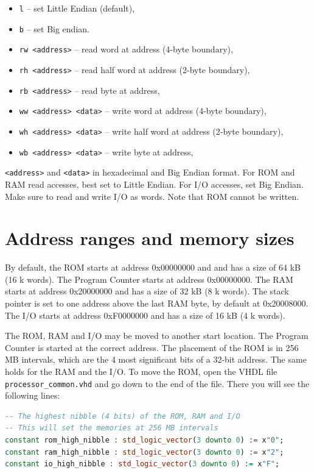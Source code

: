 \documentclass[12pt]{article}
\begin{document}
\begin{itemize}
\item \texttt{l} -- set Little Endian (default),
\item \texttt{b} -- set Big endian.
\item \texttt{rw <address>} -- read word at address (4-byte boundary),
\item \texttt{rh <address>} -- read half word at address (2-byte boundary),
\item \texttt{rb <address>} -- read byte at address,
\item \texttt{ww <address> <data>} -- write word at address (4-byte boundary),
\item \texttt{wh <address> <data>} -- write half word at address (2-byte boundary),
\item \texttt{wb <address> <data>} -- write byte at address,
\end{itemize}

\texttt{<address>} and \texttt{<data>} in hexadecimal and Big Endian format. For ROM and RAM read accesses, best set to Little Endian. For I/O accesses, set Big Endian. Make sure to read and write I/O as words. Note that ROM cannot be written.

\section{Address ranges and memory sizes}
By default, the ROM starts at address 0x00000000 and and has a size of 64 kB (16 k words). The Program Counter starts at address 0x00000000. The RAM starts at address 0x20000000 and has a size of 32 kB (8 k words). The stack pointer is set to one address above the last RAM byte, by default at 0x20008000. The I/O starts at address 0xF0000000 and has a size of 16 kB (4 k words).

The ROM, RAM and I/O may be moved to another start location. The Program Counter is started at the correct address. The placement of the ROM is in 256 MB intervals, which are the 4 most significant bits of a 32-bit address. The same holds for the RAM and the I/O. To move the ROM, open the VHDL file \lstinline|processor_common.vhd| and go down to the end of the file. There you will see the following lines:

\begin{lstlisting}[language=VHDL]
-- The highest nibble (4 bits) of the ROM, RAM and I/O
-- This will set the memories at 256 MB intervals
constant rom_high_nibble : std_logic_vector(3 downto 0) := x"0";
constant ram_high_nibble : std_logic_vector(3 downto 0) := x"2";
constant io_high_nibble : std_logic_vector(3 downto 0) := x"F";
\end{lstlisting}
\end{document}
